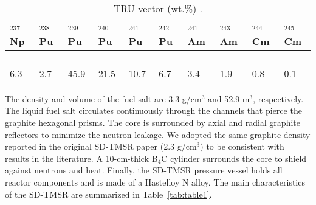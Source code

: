 \begin{table} %
	\centering
	\caption{TRU vector (wt.\%) \cite{de2000scenarios}.}
	\vspace{0.1in}
	\begin{tabularx}{\textwidth}{X X X X X X X X X X}
		\hline
		$^{237}$Np&$^{238}$Pu & $^{239}$Pu & $^{240}$Pu & $^{241}$Pu & $^{242}$Pu&$^{241}$Am &$^{243}$Am&$^{244}$Cm &$^{245}$Cm\\
		\hline
		$ $ $ $ $ $ $ $ $ $6.3&$ $ $ $ $ $ $ $ $ $2.7& $ $ $ $ $ $45.9& $ $ $ $ $ $21.5& $ $ $ $ $ $10.7&$ $ $ $ $ $ $ $ $ $6.7&$ $ $ $ $ $ $ $ $ $3.4&$ $ $ $ $ $ $ $ $ $1.9&$ $ $ $ $ $ $ $ $ $$ $0.8&$ $ $ $ $ $ $ $ $ $0.1 \\
		\hline
	\end{tabularx}
	\label{tab:table53}
\end{table}

The density and volume of the fuel salt are 3.3 g/cm$^{3}$ and 52.9 m$^3$, 
respectively. The liquid fuel salt circulates continuously through the channels
that pierce the graphite hexagonal prisms. The core is surrounded by 
axial and radial graphite reflectors to minimize the neutron leakage.
We adopted the same graphite density reported in the original SD-TMSR paper (2.3 g/cm$^3$) \cite{li_optimization_2018} to be consistent with results in the literature.
A 10-cm-thick B$_4$C cylinder surrounds the core to shield against neutrons and heat.
Finally, the SD-TMSR pressure vessel holds all reactor components and is made of 
a Hastelloy N alloy. The main characteristics of the SD-TMSR are 
summarized in Table~\ref{tab:table1}.


